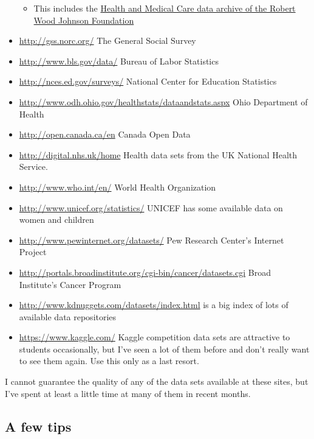 \documentclass[]{book}
\providecommand{\tightlist}{%
  \setlength{\itemsep}{0pt}\setlength{\parskip}{0pt}}
\theoremstyle{definition}
\theoremstyle{definition}
\theoremstyle{definition}
\theoremstyle{remark}
\begin{document}
\begin{itemize}
  \begin{itemize}
  \tightlist
  \item
    This includes the
    \href{http://www.icpsr.umich.edu/icpsrweb/HMCA/}{Health and Medical
    Care data archive of the Robert Wood Johnson Foundation}
  \end{itemize}
\item
  \url{http://gss.norc.org/} The General Social Survey
\item
  \url{http://www.bls.gov/data/} Bureau of Labor Statistics
\item
  \url{http://nces.ed.gov/surveys/} National Center for Education
  Statistics
\item
  \url{http://www.odh.ohio.gov/healthstats/dataandstats.aspx} Ohio
  Department of Health
\item
  \url{http://open.canada.ca/en} Canada Open Data
\item
  \url{http://digital.nhs.uk/home} Health data sets from the UK National
  Health Service.
\item
  \url{http://www.who.int/en/} World Health Organization
\item
  \url{http://www.unicef.org/statistics/} UNICEF has some available data
  on women and children
\item
  \url{http://www.pewinternet.org/datasets/} Pew Research Center's
  Internet Project
\item
  \url{http://portals.broadinstitute.org/cgi-bin/cancer/datasets.cgi}
  Broad Institute's Cancer Program
\item
  \url{http://www.kdnuggets.com/datasets/index.html} is a big index of
  lots of available data repositories
\item
  \url{https://www.kaggle.com/} Kaggle competition data sets are
  attractive to students occasionally, but I've seen a lot of them
  before and don't really want to see them again. Use this only as a
  last resort.
\end{itemize}

I cannot guarantee the quality of any of the data sets available at
these sites, but I've spent at least a little time at many of them in
recent months.

\hypertarget{a-few-tips}{%
\subsection{A few tips}\label{a-few-tips}}
\end{document}
